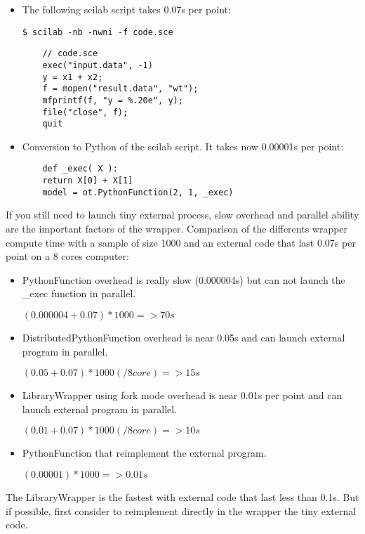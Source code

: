 \begin{itemize}
\item The following scilab script takes 0.07s per point:

  \verb|$ scilab -nb -nwni -f code.sce|

  \begin{lstlisting}
    // code.sce
    exec("input.data", -1)
    y = x1 + x2;
    f = mopen("result.data", "wt");
    mfprintf(f, "y = %.20e", y);
    file("close", f);
    quit
  \end{lstlisting}


\item Conversion to Python of the scilab script. It takes now 0.00001s per point:

  \begin{lstlisting}
    def _exec( X ):
    return X[0] + X[1]
    model = ot.PythonFunction(2, 1, _exec)
  \end{lstlisting}
\end{itemize}

If you still need to launch tiny external process, slow overhead and parallel ability are the important factors of the wrapper.
Comparison of the differents wrapper compute time with a sample of size 1000 and an external code that last 0.07s per point on a 8 cores computer:

\begin{itemize}
\item PythonFunction overhead is really slow (0.000004s) but can not launch the \_exec function in parallel.

  $(0.000004+0.07)*1000 => 70s$
\item DistributedPythonFunction overhead is near 0.05s and can launch external program in parallel.

  $(0.05+0.07)*1000 (/8core) => 15s$
\item LibraryWrapper using fork mode overhead is near 0.01s per point and can launch external program in parallel.

  $(0.01+0.07)*1000 (/8core) => 10s$

\item PythonFunction that reimplement the external program.

  $(0.00001)*1000 => 0.01s$

\end{itemize}

The LibraryWrapper is the fastest with external code that last less than 0.1s. But if possible, first consider to reimplement directly in the wrapper the tiny external code.
